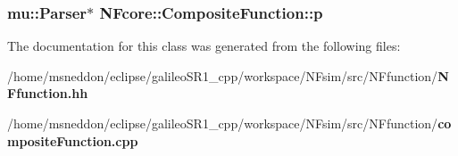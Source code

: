 \subsubsection{\setlength{\rightskip}{0pt plus 5cm}mu::Parser$\ast$ {\bf NFcore::CompositeFunction::p}\hspace{0.3cm}{\tt  [protected]}}\label{classNFcore_1_1CompositeFunction_21c7c20de56910c1b4299a050b7a399a}




The documentation for this class was generated from the following files:\begin{CompactItemize}
\item 
/home/msneddon/eclipse/galileoSR1\_\-cpp/workspace/NFsim/src/NFfunction/{\bf NFfunction.hh}\item 
/home/msneddon/eclipse/galileoSR1\_\-cpp/workspace/NFsim/src/NFfunction/{\bf compositeFunction.cpp}\end{CompactItemize}
